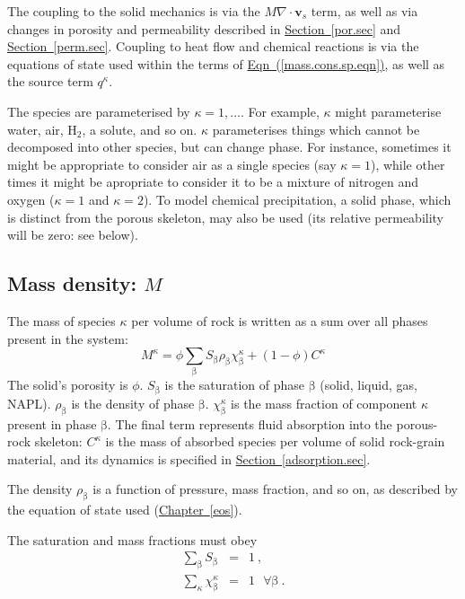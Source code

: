 \documentclass[12pt]{report}
\def\species{\kappa}
\def\phase{\mathrm{\beta}}
\def\massfrac{\chi}
\begin{document}
The coupling to the solid mechanics is via the $M\nabla\cdot {\mathbf
  v}_{s}$ term, as well as via changes in porosity and permeability
described in \hyperref[por.sec]{Section~\ref*{por.sec}} and
\hyperref[perm.sec]{Section~\ref*{perm.sec}}.  Coupling to heat flow
and chemical reactions is via the equations of state used within the
terms of \hyperref[mass.cons.sp.eqn]{Eqn~(\ref*{mass.cons.sp.eqn})},
as well as the source term $q^{\species}$.

The species are parameterised by $\species = 1,\ldots$.  For example,
$\species$ might parameterise water, air, H$_{2}$, a solute, and so
on.  $\species$ parameterises things which cannot be decomposed into
other species, but can change phase.  For instance, sometimes it might
be appropriate to consider air as a single species (say $\species=1$),
while other times it might be apropriate to consider it to be a
mixture of nitrogen and oxygen ($\species=1$ and $\species=2$).  To
model chemical precipitation, a solid phase, which is distinct from
the porous skeleton, may also be used (its relative permeability will
be zero: see below).

\subsection{Mass density: $M$}

The mass of species $\species$ per volume of rock is written as a sum
over all phases present in the system:
\begin{equation}
M^{\species} =
\phi\sum_{\phase}S_{\phase}\rho_{\phase}\massfrac_{\phase}^{\species}
+ (1 - \phi)C^{\species}
\label{eqn.msph}
\end{equation}
The solid's porosity is $\phi$.  $S_{\phase}$ is the saturation of
phase $\phase$ (solid, liquid, gas, NAPL).  $\rho_{\phase}$ is the density of
phase $\phase$.  $\massfrac_{\phase}^{\species}$ is the mass fraction
of component $\species$ present in phase $\phase$.  The final term
represents fluid absorption into the porous-rock skeleton:
$C^{\species}$ is the mass of absorbed species per volume of solid
rock-grain material, and its dynamics is specified in
\hyperref[adsorption.sec]{Section~\ref*{adsorption.sec}}.

The density $\rho_{\phase}$ is a function of pressure, mass fraction,
and so on, as described by the equation of state used
(\hyperref[eos]{Chapter~\ref*{eos}}).

The saturation and mass fractions must obey
\begin{eqnarray}
\sum_{\phase}S_{\phase} & = & 1 \ , \\
\sum_{\species}\massfrac_{\phase}^{\species} & = & 1 \ \ \ \forall
\phase \ .
\end{eqnarray}
\end{document}
